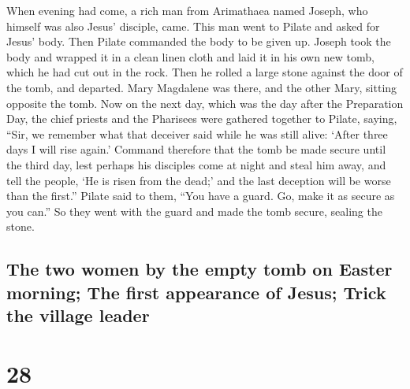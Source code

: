  When evening had come, a rich man from Arimathaea named
Joseph, who himself was also Jesus' disciple, came.  This
man went to Pilate and asked for Jesus' body. Then Pilate commanded the
body to be given up.  Joseph took the body and wrapped it
in a clean linen cloth  and laid it in his own new tomb,
which he had cut out in the rock. Then he rolled a large stone against
the door of the tomb, and departed.  Mary Magdalene was
there, and the other Mary, sitting opposite the tomb. 
Now on the next day, which was the day after the Preparation Day, the
chief priests and the Pharisees were gathered together to Pilate,
 saying, ``Sir, we remember what that deceiver said while
he was still alive: `After three days I will rise again.'
 Command therefore that the tomb be made secure until the
third day, lest perhaps his disciples come at night and steal him away,
and tell the people, `He is risen from the dead;' and the last deception
will be worse than the first.''  Pilate said to them,
``You have a guard. Go, make it as secure as you can.'' 
So they went with the guard and made the tomb secure, sealing the stone.

\hypertarget{the-two-women-by-the-empty-tomb-on-easter-morning-the-first-appearance-of-jesus-trick-the-village-leader}{%
\subsection{The two women by the empty tomb on Easter morning; The first
appearance of Jesus; Trick the village
leader}\label{the-two-women-by-the-empty-tomb-on-easter-morning-the-first-appearance-of-jesus-trick-the-village-leader}}

\hypertarget{section-27}{%
\section{28}\label{section-27}}

